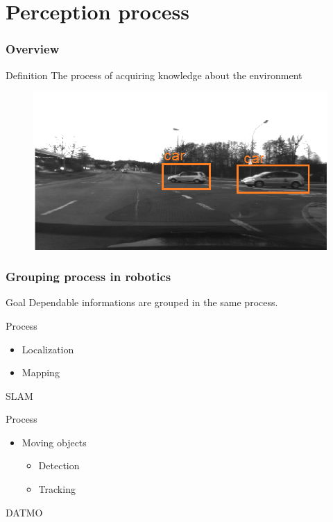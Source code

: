\documentclass{beamer}
\begin{document}
\section{Perception process}

	\begin{frame}
		\frametitle{Overview}
		\begin{block}{Definition}
			The process of acquiring knowledge about the environment \cite{iyengar1991autonomous}
		\end{block}	
		
		\begin{figure}[h]
			\center
			\includegraphics[scale=0.3]{img/fig:perception:ex1}
		 \end{figure}
		 
	\end{frame}

	\begin{frame}
		\frametitle{Grouping process in robotics}
		
		\begin{block}{Goal}		
			Dependable informations are grouped in the same process.
		\end{block}			
		
		\begin{exampleblock}{Process}		
		
			\begin{itemize}
			\item Localization
			\item Mapping
			\end{itemize}			
		
			SLAM
		\end{exampleblock}					
				
		\begin{exampleblock}{Process}		
			\begin{itemize}
			\item Moving objects
				\begin{itemize}
				\item Detection
				\item Tracking
				\end{itemize}			
			\end{itemize}			
			DATMO
		\end{exampleblock}						
				
	\end{frame}
\end{document}
